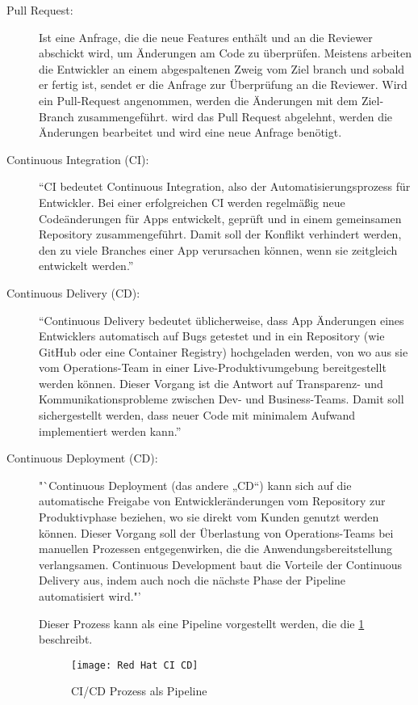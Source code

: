 \begin{description}
\begin{description}
		\end{description}	
				
	\item [Pull Request:]
		Ist eine Anfrage, die die neue Features enthält und an die Reviewer abschickt wird, um Änderungen am Code zu überprüfen. Meistens arbeiten die Entwickler an einem abgespaltenen 			Zweig vom Ziel branch und sobald er fertig ist, sendet er die Anfrage zur Überprüfung an die Reviewer. Wird ein Pull-Request angenommen, werden die Änderungen mit dem Ziel- 				Branch zusammengeführt. wird das Pull Request abgelehnt, werden die Änderungen bearbeitet und wird eine neue Anfrage benötigt.
	
	\item [Continuous Integration (CI):]
		"`CI bedeutet Continuous Integration, also der Automatisierungsprozess für Entwickler. Bei einer erfolgreichen CI werden regelmäßig neue Codeänderungen für Apps entwickelt, 				geprüft und in einem gemeinsamen Repository zusammengeführt. Damit soll der Konflikt verhindert werden, den zu viele Branches einer App verursachen können, wenn sie zeitgleich 			entwickelt werden."' \cite{RedHat}
			
	\item [Continuous Delivery (CD):]
		"`Continuous Delivery bedeutet üblicherweise, dass App Änderungen eines Entwicklers automatisch auf Bugs getestet und in ein Repository (wie GitHub oder eine Container 					Registry) hochgeladen werden, von wo aus sie vom Operations-Team in einer Live-Produktivumgebung bereitgestellt werden können. Dieser Vorgang ist die Antwort auf Transparenz- 				und Kommunikationsprobleme zwischen Dev- und Business-Teams. Damit soll sichergestellt werden, dass neuer Code mit minimalem Aufwand implementiert werden kann."' \cite{RedHat}
		
	\item [Continuous Deployment (CD):]
		"`Continuous Deployment (das andere „CD“) kann sich auf die automatische Freigabe von Entwickleränderungen vom Repository zur Produktivphase beziehen, wo sie direkt vom Kunden 			genutzt werden können. Dieser Vorgang soll der Überlastung von Operations-Teams bei manuellen Prozessen entgegenwirken, die die Anwendungsbereitstellung verlangsamen. Continuous 		Development baut die Vorteile der Continuous Delivery aus, indem auch noch die nächste Phase der Pipeline automatisiert wird."' \cite{RedHat}

	Dieser Prozess kann als eine Pipeline vorgestellt werden, die die \cref{fig:RedHat} beschreibt.
	\begin{figure}[H]
		\centering
		\texttt{[image: Red Hat CI CD]}
		\caption[\ac{CI}/\ac{CD}]{\ac{CI}/\ac{CD} Prozess als Pipeline\\ \cite{RedHat}}
		\label{fig:RedHat}
	\end{figure}
	
\end{description}

